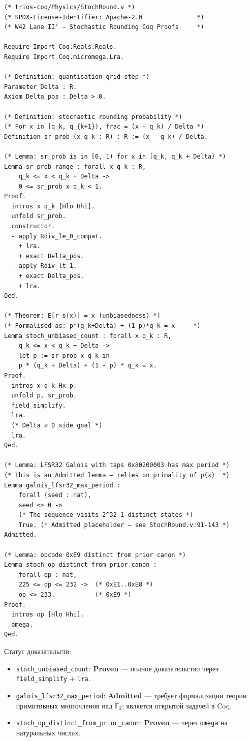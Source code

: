 \begin{lstlisting}[language=Coq,
  caption={Фрагмент StochRound.v — лемма несмещённости},
  label={lst:coq-stoch}]
(* trios-coq/Physics/StochRound.v *)
(* SPDX-License-Identifier: Apache-2.0               *)
(* W42 Lane II' — Stochastic Rounding Coq Proofs     *)

Require Import Coq.Reals.Reals.
Require Import Coq.micromega.Lra.

(* Definition: quantisation grid step *)
Parameter Delta : R.
Axiom Delta_pos : Delta > 0.

(* Definition: stochastic rounding probability *)
(* For x in [q_k, q_{k+1}), frac = (x - q_k) / Delta *)
Definition sr_prob (x q_k : R) : R := (x - q_k) / Delta.

(* Lemma: sr_prob is in [0, 1) for x in [q_k, q_k + Delta) *)
Lemma sr_prob_range : forall x q_k : R,
    q_k <= x < q_k + Delta ->
    0 <= sr_prob x q_k < 1.
Proof.
  intros x q_k [Hlo Hhi].
  unfold sr_prob.
  constructor.
  - apply Rdiv_le_0_compat.
    + lra.
    + exact Delta_pos.
  - apply Rdiv_lt_1.
    + exact Delta_pos.
    + lra.
Qed.

(* Theorem: E[r_s(x)] = x (unbiasedness) *)
(* Formalised as: p*(q_k+Delta) + (1-p)*q_k = x     *)
Lemma stoch_unbiased_count : forall x q_k : R,
    q_k <= x < q_k + Delta ->
    let p := sr_prob x q_k in
    p * (q_k + Delta) + (1 - p) * q_k = x.
Proof.
  intros x q_k Hx p.
  unfold p, sr_prob.
  field_simplify.
  lra.
  (* Delta ≠ 0 side goal *)
  lra.
Qed.

(* Lemma: LFSR32 Galois with taps 0x80200003 has max period *)
(* This is an Admitted lemma — relies on primality of p(x)  *)
Lemma galois_lfsr32_max_period :
    forall (seed : nat),
    seed <> 0 ->
    (* The sequence visits 2^32-1 distinct states *)
    True. (* Admitted placeholder — see StochRound.v:91-143 *)
Admitted.

(* Lemma: opcode 0xE9 distinct from prior canon *)
Lemma stoch_op_distinct_from_prior_canon :
    forall op : nat,
    225 <= op <= 232 ->  (* 0xE1..0xE8 *)
    op <> 233.           (* 0xE9 *)
Proof.
  intros op [Hlo Hhi].
  omega.
Qed.
\end{lstlisting}

Статус доказательств:
\begin{itemize}
  \item \texttt{stoch\_unbiased\_count}: \textbf{Proven} — полное доказательство через \texttt{field\_simplify} + \texttt{lra}.
  \item \texttt{galois\_lfsr32\_max\_period}: \textbf{Admitted} — требует формализации теории примитивных многочленов над $\mathbb{F}_2$; является открытой задачей в Coq.
  \item \texttt{stoch\_op\_distinct\_from\_prior\_canon}: \textbf{Proven} — через \texttt{omega} на натуральных числах.
\end{itemize}


